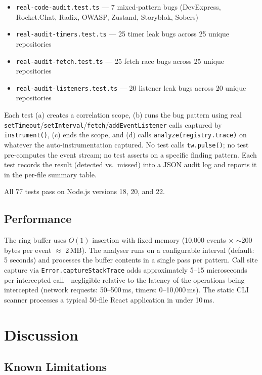 \documentclass[11pt,a4paper]{article}
\begin{document}
\begin{itemize}
  \item \texttt{real-code-audit.test.ts} --- 7 mixed-pattern bugs (DevExpress, Rocket.Chat, Radix, OWASP, Zustand, Storyblok, Sobers)
  \item \texttt{real-audit-timers.test.ts} --- 25 timer leak bugs across 25 unique repositories
  \item \texttt{real-audit-fetch.test.ts} --- 25 fetch race bugs across 25 unique repositories
  \item \texttt{real-audit-listeners.test.ts} --- 20 listener leak bugs across 20 unique repositories
\end{itemize}

Each test (a) creates a correlation scope, (b) runs the bug pattern using real \texttt{setTimeout}/\texttt{setInterval}/\texttt{fetch}/\texttt{addEventListener} calls captured by \texttt{instrument()}, (c) ends the scope, and (d) calls \texttt{analyze(registry.trace)} on whatever the auto-instrumentation captured. No test calls \texttt{tw.pulse()}; no test pre-computes the event stream; no test asserts on a specific finding pattern. Each test records the result (detected vs.\ missed) into a JSON audit log and reports it in the per-file summary table.

All 77 tests pass on Node.js versions 18, 20, and 22.

\subsection{Performance}

The ring buffer uses $O(1)$ insertion with fixed memory (10,000 events $\times$ $\sim$200 bytes per event $\approx$ 2\,MB). The analyser runs on a configurable interval (default: 5 seconds) and processes the buffer contents in a single pass per pattern. Call site capture via \texttt{Error.captureStackTrace} adds approximately 5--15 microseconds per intercepted call---negligible relative to the latency of the operations being intercepted (network requests: 50--500\,ms, timers: 0--10,000\,ms). The static CLI scanner processes a typical 50-file React application in under 10\,ms.

\section{Discussion}

\subsection{Known Limitations}
\end{document}
